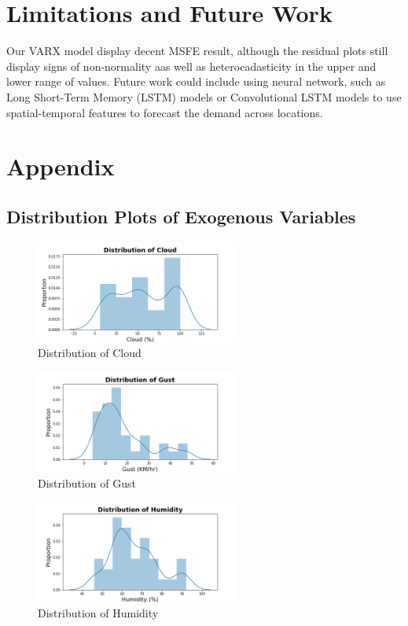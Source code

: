 \documentclass[12pt, letterpaper] {article}
\begin{document}
\section{Limitations and Future Work}
Our VARX model display decent MSFE result, although the residual plots still display signs of non-normality aas well as heterocadasticity in the upper and lower range of values. Future work could include using neural network, such as Long Short-Term Memory (LSTM) models or Convolutional LSTM models to use spatial-temporal features to forecast the demand across locations.

\section{Appendix}
\subsection{Distribution Plots of Exogenous Variables}
\begin{figure}[H]
    \centering
    \includegraphics[width=0.6\textwidth, height=0.3\textheight]{Images/distplot_cloud.png}
    \caption{Distribution of Cloud}
    \label{fig:Distribution of Cloud}
\end{figure}

\begin{figure}[H]
    \centering
    \includegraphics[width=0.6\textwidth, height=0.3\textheight]{Images/distplot_gust.png}
    \caption{Distribution of Gust}
    \label{fig:Distribution of Gust}
\end{figure}

\begin{figure}[H]
    \centering
    \includegraphics[width=0.6\textwidth, height=0.3\textheight]{Images/distplot_humidity.png}
    \caption{Distribution of Humidity}
    \label{fig:Distribution of Humidity}
\end{figure}
\end{document}
